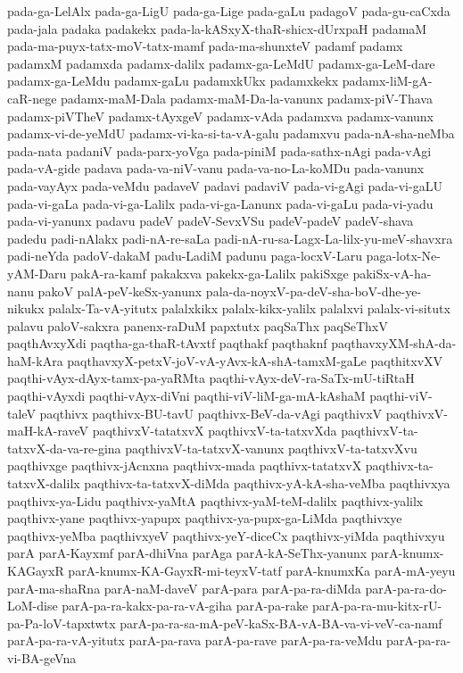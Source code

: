 {pada-ga-LelAlx
pada-ga-LigU
pada-ga-Lige
pada-gaLu
padagoV
pada-gu-caCxda
pada-jala
padaka
padakekx
pada-la-kASxyX-thaR-shicx-dUrxpaH
padamaM
pada-ma-puyx-tatx-moV-tatx-mamf
pada-ma-shunxteV
padamf
padamx
padamxM
padamxda
padamx-dalilx
padamx-ga-LeMdU
padamx-ga-LeM-dare
padamx-ga-LeMdu
padamx-gaLu
padamxkUkx
padamxkekx
padamx-liM-gA-caR-nege
padamx-maM-Dala
padamx-maM-Da-la-vanunx
padamx-piV-Thava
padamx-piVTheV
padamx-tAyxgeV
padamx-vAda
padamxva
padamx-vanunx
padamx-vi-de-yeMdU
padamx-vi-ka-si-ta-vA-galu
padamxvu
pada-nA-sha-neMba
pada-nata
padaniV
pada-parx-yoVga
pada-piniM
pada-sathx-nAgi
pada-vAgi
pada-vA-gide
padava
pada-va-niV-vanu
pada-va-no-La-koMDu
pada-vanunx
pada-vayAyx
pada-veMdu
padaveV
padavi
padaviV
pada-vi-gAgi
pada-vi-gaLU
pada-vi-gaLa
pada-vi-ga-Lalilx
pada-vi-ga-Lanunx
pada-vi-gaLu
pada-vi-yadu
pada-vi-yanunx
padavu
padeV
padeV-SevxVSu
padeV-padeV
padeV-shava
padedu
padi-nAlakx
padi-nA-re-saLa
padi-nA-ru-sa-Lagx-La-lilx-yu-meV-shavxra
padi-neYda
padoV-dakaM
padu-LadiM
padunu
paga-locxV-Laru
paga-lotx-Ne-yAM-Daru
pakA-ra-kamf
pakakxva
pakekx-ga-Lalilx
pakiSxge
pakiSx-vA-ha-nanu
pakoV
palA-peV-keSx-yanunx
pala-da-noyxV-pa-deV-sha-boV-dhe-ye-nikukx
palalx-Ta-vA-yitutx
palalxkikx
palalx-kikx-yalilx
palalxvi
palalx-vi-situtx
palavu
paloV-sakxra
panenx-raDuM
papxtutx
paqSaThx
paqSeThxV
paqthAvxyXdi
paqtha-ga-thaR-tAvxtf
paqthakf
paqthaknf
paqthavxyXM-shA-da-haM-kAra
paqthavxyX-petxV-joV-vA-yAvx-kA-shA-tamxM-gaLe
paqthitxvXV
paqthi-vAyx-dAyx-tamx-pa-yaRMta
paqthi-vAyx-deV-ra-SaTx-mU-tiRtaH
paqthi-vAyxdi
paqthi-vAyx-diVni
paqthi-viV-liM-ga-mA-kAshaM
paqthi-viV-taleV
paqthivx
paqthivx-BU-tavU
paqthivx-BeV-da-vAgi
paqthivxV
paqthivxV-maH-kA-raveV
paqthivxV-tatatxvX
paqthivxV-ta-tatxvXda
paqthivxV-ta-tatxvX-da-va-re-gina
paqthivxV-ta-tatxvX-vanunx
paqthivxV-ta-tatxvXvu
paqthivxge
paqthivx-jAcnxna
paqthivx-mada
paqthivx-tatatxvX
paqthivx-ta-tatxvX-dalilx
paqthivx-ta-tatxvX-diMda
paqthivx-yA-kA-sha-veMba
paqthivxya
paqthivx-ya-Lidu
paqthivx-yaMtA
paqthivx-yaM-teM-dalilx
paqthivx-yalilx
paqthivx-yane
paqthivx-yapupx
paqthivx-ya-pupx-ga-LiMda
paqthivxye
paqthivx-yeMba
paqthivxyeV
paqthivx-yeY-diceCx
paqthivx-yiMda
paqthivxyu
parA
parA-Kayxmf
parA-dhiVna
parAga
parA-kA-SeThx-yanunx
parA-knumx-KAGayxR
parA-knumx-KA-GayxR-mi-teyxV-tatf
parA-knumxKa
parA-mA-yeyu
parA-ma-shaRna
parA-naM-daveV
parA-para
parA-pa-ra-diMda
parA-pa-ra-do-LoM-dise
parA-pa-ra-kakx-pa-ra-vA-giha
parA-pa-rake
parA-pa-ra-mu-kitx-rU-pa-Pa-loV-tapxtwtx
parA-pa-ra-sa-mA-peV-kaSx-BA-vA-BA-va-vi-veV-ca-namf
parA-pa-ra-vA-yitutx
parA-pa-rava
parA-pa-rave
parA-pa-ra-veMdu
parA-pa-ra-vi-BA-geVna
}
